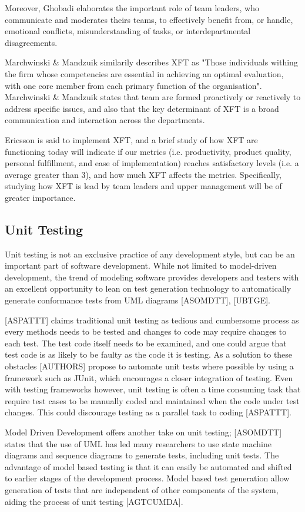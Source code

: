 \documentclass[fina_report_innit.tex]{subfiles}
\begin{document}
Moreover, Ghobadi elaborates the important role of team leaders, who communicate and moderates theirs teams, to effectively benefit from, or handle, emotional conflicts, misunderstanding of tasks, or interdepartmental disagreements.

Marchwinski \& Mandzuik similarily describes XFT as "Those individuals withing the firm whose competencies are essential in achieving an optimal evaluation, with one core member from each primary function of the organisation". Marchwinski \& Mandzuik states that team are formed proactively or reactively to address specific issues, and also that the key determinant of XFT is a broad communication and interaction across the departments.

Ericsson is said to implement XFT, and a brief study of how XFT are functioning today will indicate if our metrics (i.e. productivity, product quality, personal fulfillment, and ease of implementation) reaches satisfactory levels (i.e. a average greater than 3), and how much XFT affects the metrics. Specifically, studying how XFT is lead by team leaders and upper management will be of greater importance.

\subsection{Unit Testing}
Unit testing is not an exclusive practice of any development style, but can be an important part of software development. While not limited to model-driven development, the trend of modeling software provides developers and testers with an excellent opportunity to lean on test generation technology to automatically generate conformance tests from UML diagrams [ASOMDTT], [UBTGE].  

[ASPATTT] claims traditional unit testing as tedious and cumbersome process as every methods needs to be tested and changes to code may require changes to each test. The test code itself needs to be examined, and one could argue that test code is as likely to be faulty as the code it is testing. As a solution to these obstacles [AUTHORS] propose to automate unit tests where possible by using a framework such as JUnit, which encourages a closer integration of testing. Even with testing frameworks however,  unit testing is often a time consuming task that require test cases to be manually coded and maintained when the code under test changes. This could discourage testing as a parallel task to coding [ASPATTT]. 

Model Driven Development offers another take on unit testing; [ASOMDTT] states that the use of UML has led many researchers to use state machine diagrams and sequence diagrams to generate tests, including unit tests. The advantage of model based testing is that it can easily be automated and shifted to earlier stages of the development process. Model based test generation allow generation of tests that are independent of other components of the system, aiding the process of unit testing [AGTCUMDA].
\end{document}
